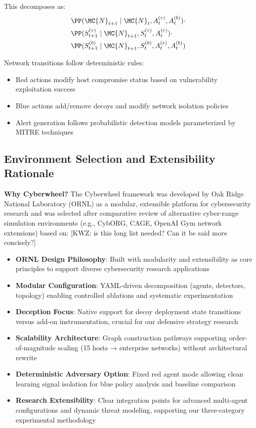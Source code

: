 \documentclass[12pt,oneside]{article}
\newcommand{\kwz}[1]{
  {\color{magenta} [KWZ: {#1}]}
 }
\begin{document}
This decomposes as:
\begin{align}
&\PP(\MC{N}_{t+1} \mid \MC{N}_t, A_t^{(r)}, A_t^{(b)}) \cdot \\
&\PP(S_{t+1}^{(r)} \mid \MC{N}_{t+1}, S_t^{(r)}, A_t^{(r)}) \cdot \\
&\PP(S_{t+1}^{(b)} \mid \MC{N}_{t+1}, S_t^{(b)}, A_t^{(r)}, A_t^{(b)})
\end{align}

Network transitions follow deterministic rules:
\begin{itemize}
    \item Red actions modify host compromise status based on vulnerability exploitation success
    \item Blue actions add/remove decoys and modify network isolation policies
    \item Alert generation follows probabilistic detection models parameterized by MITRE techniques
\end{itemize}

\subsection{Environment Selection and Extensibility Rationale}

\textbf{Why Cyberwheel?} The Cyberwheel framework was developed by Oak Ridge National Laboratory (ORNL) as a modular, extensible platform for cybersecurity research and was selected after comparative review of alternative cyber-range simulation environments (e.g., CybORG, CAGE, OpenAI Gym network extensions) based on: \kwz{is this long list needed? Can it be said more concisely?}
\begin{itemize}
    \item \textbf{ORNL Design Philosophy}: Built with modularity and extensibility as core principles to support diverse cybersecurity research applications
    \item \textbf{Modular Configuration}: YAML-driven decomposition (agents, detectors, topology) enabling controlled ablations and systematic experimentation
    \item \textbf{Deception Focus}: Native support for decoy deployment state transitions versus add-on instrumentation, crucial for our defensive strategy research
    \item \textbf{Scalability Architecture}: Graph construction pathways supporting order-of-magnitude scaling (15 hosts → enterprise networks) without architectural rewrite
    \item \textbf{Deterministic Adversary Option}: Fixed red agent mode allowing clean learning signal isolation for blue policy analysis and baseline comparison
    \item \textbf{Research Extensibility}: Clear integration points for advanced multi-agent configurations and dynamic threat modeling, supporting our three-category experimental methodology
\end{itemize}
\end{document}

